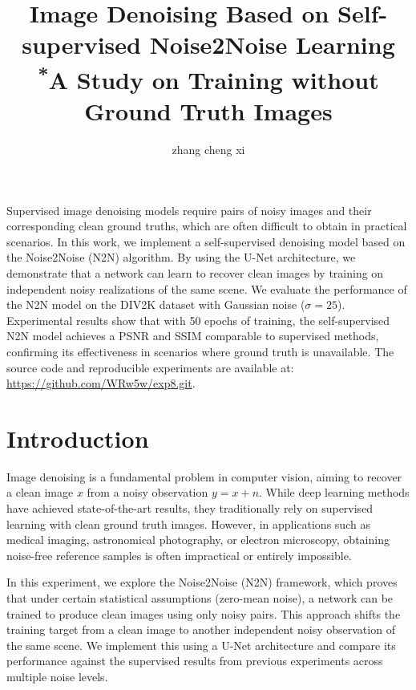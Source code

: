 \documentclass[conference]{IEEEtran}
\renewenvironment{abstract}{%
    \ifCLASSOPTIONtwocolumn
      \section*{\centering \abstractname}%
    \else
      \begin{center}\bfseries\abstractname\end{center}\quotation
    \fi}{%
    \ifCLASSOPTIONtwocolumn\else\endquotation\fi}
\begin{document}
\title{Image Denoising Based on Self-supervised Noise2Noise Learning\\
{\footnotesize \textsuperscript{*}A Study on Training without Ground Truth Images}
}

\author{zhang cheng xi}

\maketitle

\begin{abstract}
Supervised image denoising models require pairs of noisy images and their corresponding clean ground truths, which are often difficult to obtain in practical scenarios. In this work, we implement a self-supervised denoising model based on the Noise2Noise (N2N) algorithm. By using the U-Net architecture, we demonstrate that a network can learn to recover clean images by training on independent noisy realizations of the same scene. We evaluate the performance of the N2N model on the DIV2K dataset with Gaussian noise ($\sigma=25$). Experimental results show that with 50 epochs of training, the self-supervised N2N model achieves a PSNR and SSIM comparable to supervised methods, confirming its effectiveness in scenarios where ground truth is unavailable.
The source code and reproducible experiments are available at: \url{https://github.com/WRw5w/exp8.git}.
\end{abstract}

\section{Introduction}
Image denoising is a fundamental problem in computer vision, aiming to recover a clean image $x$ from a noisy observation $y = x + n$. While deep learning methods have achieved state-of-the-art results, they traditionally rely on supervised learning with clean ground truth images. However, in applications such as medical imaging, astronomical photography, or electron microscopy, obtaining noise-free reference samples is often impractical or entirely impossible.

In this experiment, we explore the Noise2Noise (N2N) framework, which proves that under certain statistical assumptions (zero-mean noise), a network can be trained to produce clean images using only noisy pairs. This approach shifts the training target from a clean image to another independent noisy observation of the same scene. We implement this using a U-Net architecture and compare its performance against the supervised results from previous experiments across multiple noise levels.
\end{document}
